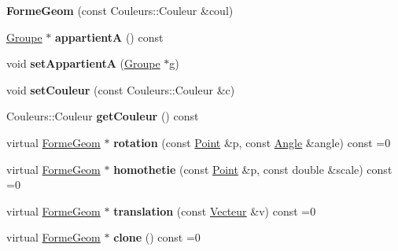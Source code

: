 \begin{DoxyCompactItemize}
\item 
\hypertarget{class_forme_geom_a522c46b60f03b3abaeb6d331d39b7980}{{\bfseries Forme\+Geom} (const Couleurs\+::\+Couleur \&coul)}\label{class_forme_geom_a522c46b60f03b3abaeb6d331d39b7980}

\item 
\hypertarget{class_forme_geom_a5f088772aeb5d24bf79b19f13239d47d}{\hyperlink{class_groupe}{Groupe} $\ast$ {\bfseries appartient\+A} () const }\label{class_forme_geom_a5f088772aeb5d24bf79b19f13239d47d}

\item 
\hypertarget{class_forme_geom_a3365e177e6dd0b1096669b425b28f47e}{void {\bfseries set\+Appartient\+A} (\hyperlink{class_groupe}{Groupe} $\ast$g)}\label{class_forme_geom_a3365e177e6dd0b1096669b425b28f47e}

\item 
\hypertarget{class_forme_geom_ad53f396ba18b26873e272856ecf72f23}{void {\bfseries set\+Couleur} (const Couleurs\+::\+Couleur \&c)}\label{class_forme_geom_ad53f396ba18b26873e272856ecf72f23}

\item 
\hypertarget{class_forme_geom_a256b60ef99c5febe866084ce4b928f3e}{Couleurs\+::\+Couleur {\bfseries get\+Couleur} () const }\label{class_forme_geom_a256b60ef99c5febe866084ce4b928f3e}

\item 
\hypertarget{class_forme_geom_a14e52f725e4eaf66d970aa67bae35812}{virtual \hyperlink{class_forme_geom}{Forme\+Geom} $\ast$ {\bfseries rotation} (const \hyperlink{class_point}{Point} \&p, const \hyperlink{class_angle}{Angle} \&angle) const =0}\label{class_forme_geom_a14e52f725e4eaf66d970aa67bae35812}

\item 
\hypertarget{class_forme_geom_abb0e0d909fc7916fdd31747780ebf44d}{virtual \hyperlink{class_forme_geom}{Forme\+Geom} $\ast$ {\bfseries homothetie} (const \hyperlink{class_point}{Point} \&p, const double \&scale) const =0}\label{class_forme_geom_abb0e0d909fc7916fdd31747780ebf44d}

\item 
\hypertarget{class_forme_geom_adebc8e4fe8dab62f4a4b03d7d3ec7230}{virtual \hyperlink{class_forme_geom}{Forme\+Geom} $\ast$ {\bfseries translation} (const \hyperlink{class_vecteur}{Vecteur} \&v) const =0}\label{class_forme_geom_adebc8e4fe8dab62f4a4b03d7d3ec7230}

\item 
\hypertarget{class_forme_geom_acca1a53eaf6886236a61541fed4b36f1}{virtual \hyperlink{class_forme_geom}{Forme\+Geom} $\ast$ {\bfseries clone} () const =0}\label{class_forme_geom_acca1a53eaf6886236a61541fed4b36f1}


\end{DoxyCompactItemize}
